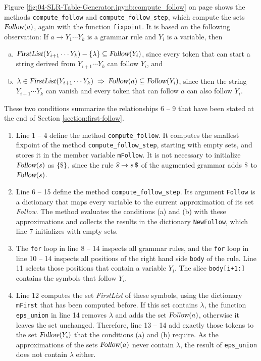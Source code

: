 \noindent
Figure \ref{fig:04-SLR-Table-Generator.ipynb:compute_follow} on page
\pageref{fig:04-SLR-Table-Generator.ipynb:compute_follow} shows the methods \texttt{compute\_follow} and
\texttt{compute\_follow\_step}, which compute the sets $\textsl{Follow}(a)$, again with the function \texttt{fixpoint}.  It is based on the following observation:  If
$a \rightarrow Y_1 \cdots Y_k$ is a grammar rule and $Y_i$ is a variable, then
\begin{enumerate}[(a)]
\item $\textsl{FirstList}(Y_{i+1} \cdots Y_k) - \{\lambda\} \subseteq \textsl{Follow}(Y_i)$, since every token that
      can start a string derived from $Y_{i+1} \cdots Y_k$ can follow $Y_i$, and
\item $\lambda \in \textsl{FirstList}(Y_{i+1} \cdots Y_k) \;\Rightarrow\; \textsl{Follow}(a) \subseteq
      \textsl{Follow}(Y_i)$, since then the string $Y_{i+1} \cdots Y_k$ can vanish and every token that can follow
      $a$ can also follow $Y_i$.
\end{enumerate}
These two conditions summarize the relationships 6 -- 9 that have been stated at the end of Section
\ref{section:first-follow}.
\begin{enumerate}
\item Line 1 -- 4 define the method \texttt{compute\_follow}.  It computes the smallest fixpoint of the method
      \texttt{compute\_follow\_step}, starting with empty sets, and stores it in the member variable
      \texttt{mFollow}.  It is not necessary to initialize $\textsl{Follow}(s)$ as $\{ \symbol{36} \}$, since the
      rule $\widehat{s} \rightarrow s\, \symbol{36}$ of the augmented grammar adds $\symbol{36}$ to
      $\textsl{Follow}(s)$.
\item Line 6 -- 15 define the method \texttt{compute\_follow\_step}.  Its argument \texttt{Follow} is a dictionary
      that maps every variable to the current approximation of its set \textsl{Follow}.  The method evaluates the
      conditions (a) and (b) with these approximations and collects the results in the dictionary
      \texttt{NewFollow}, which line 7 initializes with empty sets.
\item The \texttt{for} loop in line 8 -- 14 inspects all grammar rules, and the \texttt{for} loop in line 10 -- 14
      inspects all positions of the right hand side \texttt{body} of the rule.  Line 11 selects those positions
      that contain a variable $Y_i$.  The slice \texttt{body[i+1:]} contains the symbols that follow $Y_i$.
\item Line 12 computes the set \textsl{FirstList} of these symbols, using the dictionary \texttt{mFirst} that
      has been computed before.  If this set contains $\lambda$, the function \texttt{eps\_union} in line 14
      removes $\lambda$ and adds the set $\textsl{Follow}(a)$, otherwise it leaves the set unchanged.  Therefore,
      line 13 -- 14 add exactly those tokens to the set $\textsl{Follow}(Y_i)$ that the conditions (a) and (b)
      require.  As the approximations of the sets $\textsl{Follow}(a)$ never contain $\lambda$, the result of
      \texttt{eps\_union} does not contain $\lambda$ either.
\end{enumerate}
